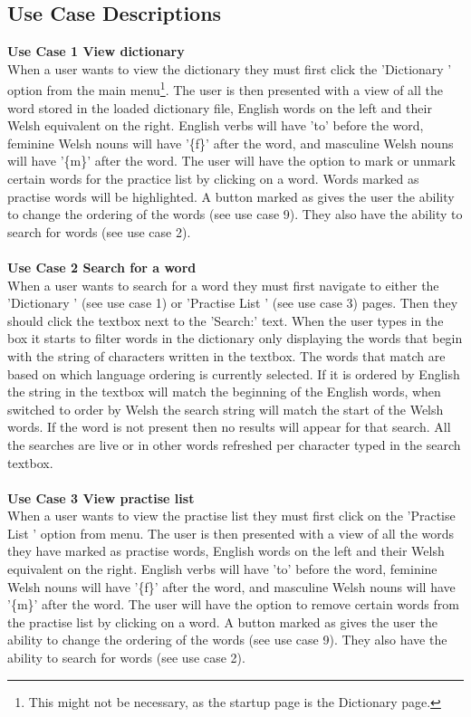 \documentclass{project}
\newcommand*{\icon}[1]{%
  \raisebox{-.3\baselineskip}{%
    \texttt{[image: \#1]}%
  }%
}
\begin{document}
\subsection{Use Case Descriptions}
\textbf{Use Case 1 View dictionary}
\\
When a user wants to view the dictionary they must first click the 'Dictionary \icon{dictionary-icon}' option from the main menu\footnote{This might not be necessary, as the startup page is the Dictionary page.}. The user is then presented with a view of all the word stored in the loaded dictionary file, English words on the left and their Welsh equivalent on the right. English verbs will have 'to' before the word, feminine Welsh nouns will have '\{f\}' after the word, and masculine Welsh nouns will have '\{m\}' after the word. The user will have the option to mark or unmark certain words for the practice list by clicking on a word. Words marked as practise words will be highlighted. A button marked as \icon{order-icon} gives the user the ability to change the ordering of the words (see use case 9). They also have the ability to search for words (see use case 2).
\\\\
\textbf{Use Case 2 Search for a word}
\\
When a user wants to search for a word they must first navigate to either the 'Dictionary \icon{dictionary-icon}' (see use case 1) or 'Practise List \icon{practise-icon}' (see use case 3) pages. Then they should click the textbox next to the 'Search:' text. When the user types in the box it starts to filter words in the dictionary only displaying the words that begin with the string of characters written in the textbox. The words that match are based on which language ordering is currently selected. If it is ordered by English the string in the textbox will match the beginning of the English words, when switched to order by Welsh the search string will match the start of the Welsh words. If the word is not present then no results will appear for that search. All the searches are live or in other words refreshed per character typed in the search textbox.
\\\\
\textbf{Use Case 3 View practise list}
\\
When a user wants to view the practise list they must first click on the 'Practise List \icon{practise-icon}' option from menu. The user is then presented with a view of all the words they have marked as practise words, English words on the left and their Welsh equivalent on the right. English verbs will have 'to' before the word, feminine Welsh nouns will have '\{f\}' after the word, and masculine Welsh nouns will have '\{m\}' after the word. The user will have the option to remove certain words from the practise list by clicking on a word. A button marked as \icon{order-icon} gives the user the ability to change the ordering of the words (see use case 9). They also have the ability to search for words (see use case 2).
\end{document}
